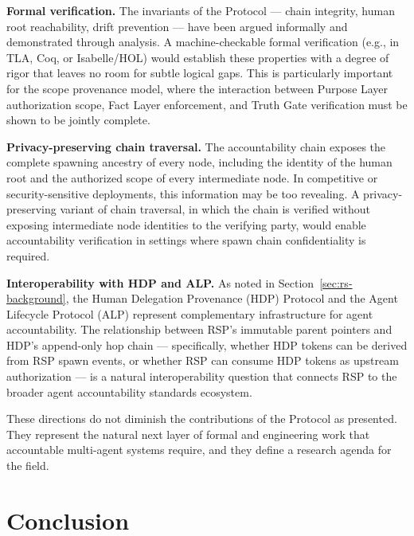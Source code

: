 \textbf{Formal verification.} The invariants of the Protocol --- chain integrity, human root reachability, drift prevention --- have been argued informally and demonstrated through analysis. A machine-checkable formal verification (e.g., in TLA\raisebox{.8ex}{\tiny +}, Coq, or Isabelle/HOL) would establish these properties with a degree of rigor that leaves no room for subtle logical gaps. This is particularly important for the scope provenance model, where the interaction between Purpose Layer authorization scope, Fact Layer enforcement, and Truth Gate verification must be shown to be jointly complete.

\textbf{Privacy-preserving chain traversal.} The accountability chain exposes the complete spawning ancestry of every node, including the identity of the human root and the authorized scope of every intermediate node. In competitive or security-sensitive deployments, this information may be too revealing. A privacy-preserving variant of chain traversal, in which the chain is verified without exposing intermediate node identities to the verifying party, would enable accountability verification in settings where spawn chain confidentiality is required.

\textbf{Interoperability with HDP and ALP.} As noted in Section~\ref{sec:rs-background}, the Human Delegation Provenance (HDP) Protocol and the Agent Lifecycle Protocol (ALP) represent complementary infrastructure for agent accountability. The relationship between RSP's immutable parent pointers and HDP's append-only hop chain --- specifically, whether HDP tokens can be derived from RSP spawn events, or whether RSP can consume HDP tokens as upstream authorization --- is a natural interoperability question that connects RSP to the broader agent accountability standards ecosystem.

These directions do not diminish the contributions of the Protocol as presented. They represent the natural next layer of formal and engineering work that accountable multi-agent systems require, and they define a research agenda for the field.




\section{Conclusion}
\label{sec:rs-conclusion}


